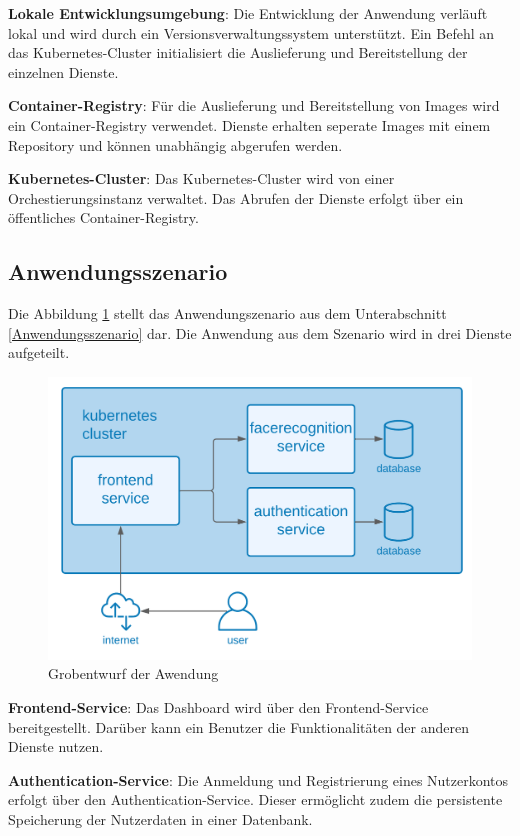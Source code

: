 \textbf{Lokale Entwicklungsumgebung}: Die Entwicklung der Anwendung verläuft lokal und wird durch ein Versionsverwaltungssystem unterstützt.
Ein Befehl an das Kubernetes-Cluster initialisiert die Auslieferung und Bereitstellung der einzelnen Dienste. 

\textbf{Container-Registry}: Für die Auslieferung und Bereitstellung von Images wird ein Container-Registry verwendet.
Dienste erhalten seperate Images mit einem Repository und können unabhängig abgerufen werden.

\textbf{Kubernetes-Cluster}: Das Kubernetes-Cluster wird von einer Orchestierungsinstanz verwaltet.
Das Abrufen der Dienste erfolgt über ein öffentliches Container-Registry.

\subsection{Anwendungsszenario}
Die Abbildung \ref{fig:GrobentwurfAnwendung} stellt das Anwendungszenario aus dem Unterabschnitt \ref{Anwendungsszenario} dar.
Die Anwendung aus dem Szenario wird in drei Dienste aufgeteilt.

\begin{figure}[!htb]
  \centering
  \includegraphics[width=0.8\columnwidth]{images/GrobentwurfAnwendung.png}
  \caption{Grobentwurf der Awendung}
  \label{fig:GrobentwurfAnwendung}
\end{figure}

\textbf{Frontend-Service}: Das Dashboard wird über den Frontend-Service bereitgestellt.
Darüber kann ein Benutzer die Funktionalitäten der anderen Dienste nutzen.

\textbf{Authentication-Service}: Die Anmeldung und Registrierung eines Nutzerkontos erfolgt über den Authentication-Service.
Dieser ermöglicht zudem die persistente Speicherung der Nutzerdaten in einer Datenbank.

